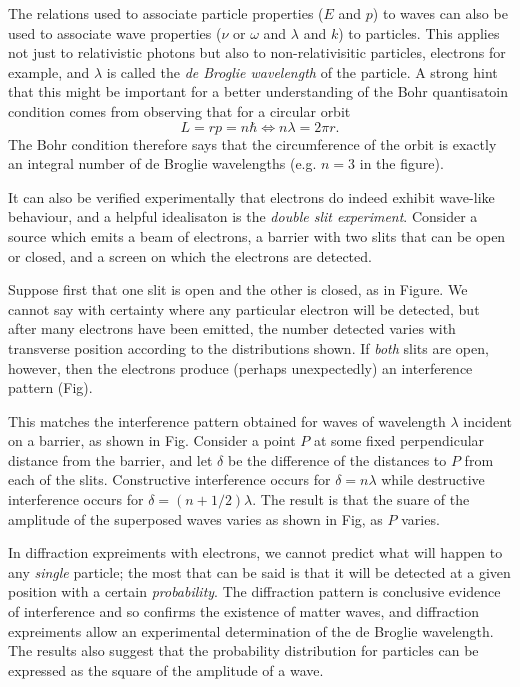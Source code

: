 \documentclass[a4paper]{article}
\begin{document}
The relations used to associate particle properties ($E$ and $p$) to waves can also be used to associate wave properties ($\nu$ or $\omega$ and $\lambda$ and $k$) to particles. This applies not just to relativistic photons but also to non-relativisitic particles, electrons for example, and $\lambda$ is called the \emph{de Broglie wavelength} of the particle. A strong hint that this might be important for a better understanding of the Bohr quantisatoin condition comes from observing that for a circular orbit
\[
  L = rp = n\hbar \Leftrightarrow n\lambda = 2\pi r.
\]
The Bohr condition therefore says that the circumference of the orbit is exactly an integral number of de Broglie wavelengths (e.g. $n=3$ in the figure).

It can also be verified experimentally that electrons do indeed exhibit wave-like behaviour, and a helpful idealisaton is the \emph{double slit experiment}. Consider a source which emits a beam of electrons, a barrier with two slits that can be open or closed, and a screen on which the electrons are detected.

Suppose first that one slit is open and the other is closed, as in Figure. We cannot say with certainty where any particular electron will be detected, but after many electrons have been emitted, the number detected varies with transverse position according to the distributions shown. If \emph{both} slits are open, however, then the electrons produce (perhaps unexpectedly) an interference pattern (Fig).

This matches the interference pattern obtained for waves of wavelength $\lambda$ incident on a barrier, as shown in Fig. Consider a point $P$ at some fixed perpendicular distance from the barrier, and let $\delta$ be the difference of the distances to $P$ from each of the slits. Constructive interference occurs for $\delta=n\lambda$ while destructive interference occurs for $\delta=(n+1/2)\lambda$. The result is that the suare of the amplitude of the superposed waves varies as shown in Fig, as $P$ varies.

In diffraction expreiments with electrons, we cannot predict what will happen to any \emph{single} particle; the most that can be said is that it will be detected at a given position with a certain \emph{probability}. The diffraction pattern is conclusive evidence of interference and so confirms the existence of matter waves, and diffraction expreiments allow an experimental determination of the de Broglie wavelength. The results also suggest that the probability distribution for particles can be expressed as the square of the amplitude of a wave.
\end{document}

